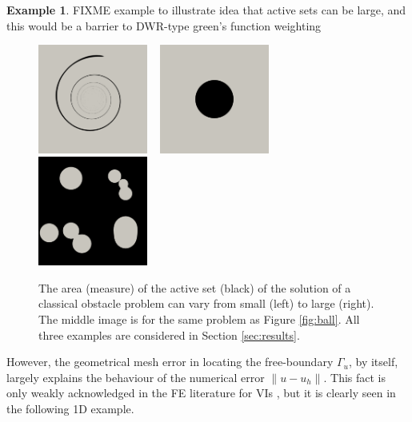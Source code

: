 \documentclass[]{interact}
\theoremstyle{plain}%
\theoremstyle{definition}
\newtheorem{example}[theorem]{Example}
\theoremstyle{remark}
\begin{document}
\begin{example} FIXME example to illustrate idea that active sets can be large, and this would be a barrier to DWR-type green's function weighting

\begin{figure}[H]
\noindent \hspace{-1mm} \mbox{\includegraphics[width=0.32\textwidth]{static/spiral.png} \,
\includegraphics[width=0.32\textwidth]{static/sphere.png} \,
\includegraphics[width=0.32\textwidth]{static/blisters.png}}
\caption{The area (measure) of the active set (black) of the solution of a classical obstacle problem can vary from small (left) to large (right).  The middle image is for the same problem as Figure \ref{fig:ball}.  All three examples are considered in Section \ref{sec:results}.}
\label{fig:activesizes}
\end{figure}

\end{example}

However, the geometrical mesh error in locating the free-boundary $\Gamma_u$, by itself, largely explains the behaviour of the numerical error $\|u-u_h\|$.  This fact is only weakly acknowledged in the FE literature for VIs \cite[for example]{Suttmeier2008}, but it is clearly seen in the following 1D example.
\end{document}
